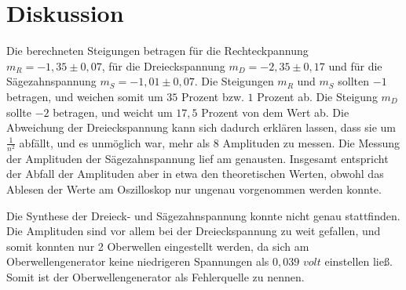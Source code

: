 \section{Diskussion}
\label{sec:Diskussion}

Die berechneten Steigungen betragen für die Rechteckpannung $m_R = -1,35 \pm 0,07$, für die
Dreieckspannung $m_D= -2,35 \pm 0,17$ und für die Sägezahnspannung $m_S= -1,01 \pm 0,07$. 
Die Steigungen $m_R$ und $m_S$ sollten $-1$ betragen, und weichen somit um $35$ Prozent bzw. $1$ Prozent ab. 
Die Steigung $m_D$ sollte $-2$ betragen, und weicht um $17,5$ Prozent von dem Wert ab. Die Abweichung 
der Dreieckspannung kann sich dadurch erklären lassen, dass sie um $\frac{1}{n^2}$ abfällt, und es unmöglich war, mehr als 8 Amplituden zu messen.
Die Messung der Amplituden der Sägezahnspannung lief am genausten. 
Insgesamt entspricht der Abfall der Amplituden aber in etwa den theoretischen Werten, obwohl das Ablesen der Werte am Oszilloskop nur ungenau vorgenommen werden konnte.

\noindent Die Synthese der Dreieck- und Sägezahnspannung konnte nicht genau stattfinden. 
Die Amplituden sind vor allem bei der Dreieckspannung zu weit gefallen, und somit konnten nur 2 Oberwellen eingestellt werden, da sich am Oberwellengenerator keine niedrigeren Spannungen als
$0,039$ $\si{volt}$ einstellen ließ.
Somit ist der Oberwellengenerator als Fehlerquelle zu nennen.